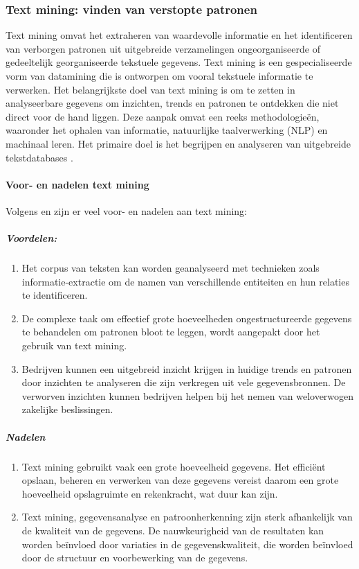 \subsubsection{Text mining: vinden van verstopte patronen}
Text mining omvat het extraheren van waardevolle informatie en het identificeren van verborgen patronen uit uitgebreide verzamelingen ongeorganiseerde of gedeeltelijk georganiseerde tekstuele gegevens. Text mining is een gespecialiseerde vorm van datamining die is ontworpen om vooral tekstuele informatie te verwerken. Het belangrijkste doel van text mining is om te zetten in analyseerbare gegevens om inzichten, trends en patronen te ontdekken die niet direct voor de hand liggen. Deze aanpak omvat een reeks methodologieën, waaronder het ophalen van informatie, natuurlijke taalverwerking (NLP) en machinaal leren. Het primaire doel is het begrijpen en analyseren van uitgebreide tekstdatabases \autocite{gaikwad2014text}.

\paragraph{Voor- en nadelen text mining}
Volgens \autocite{Kinter2024} en \autocite{gaikwad2014text} zijn er veel voor- en nadelen aan text mining:
\subparagraph{Voordelen:}
\begin{enumerate}
    \item Het corpus van teksten kan worden geanalyseerd met technieken zoals informatie-extractie om de namen van verschillende entiteiten en hun relaties te identificeren. 
    \item De complexe taak om effectief grote hoeveelheden ongestructureerde gegevens te behandelen om patronen bloot te leggen, wordt aangepakt door het gebruik van text mining.
    \item Bedrijven kunnen een uitgebreid inzicht krijgen in huidige trends en patronen door inzichten te analyseren die zijn verkregen uit vele gegevensbronnen. De verworven inzichten kunnen bedrijven helpen bij het nemen van weloverwogen zakelijke beslissingen.
    
\end{enumerate}
\subparagraph{Nadelen}
\begin{enumerate}
    \item Text mining gebruikt vaak een grote hoeveelheid gegevens. Het efficiënt opslaan, beheren en verwerken van deze gegevens vereist daarom een grote hoeveelheid opslagruimte en rekenkracht, wat duur kan zijn.
    \item Text mining, gegevensanalyse en patroonherkenning zijn sterk afhankelijk van de kwaliteit van de gegevens. De nauwkeurigheid van de resultaten kan worden beïnvloed door variaties in de gegevenskwaliteit, die worden beïnvloed door de structuur en voorbewerking van de gegevens.
\end{enumerate}


